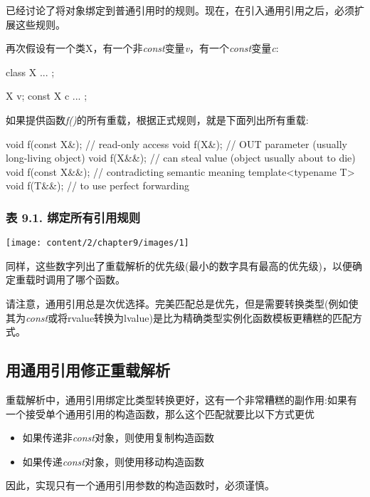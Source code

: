 已经讨论了将对象绑定到普通引用时的规则。现在，在引入通用引用之后，必须扩展这些规则。

再次假设有一个类X，有一个非\textit{const}变量\textit{v}，有一个\textit{const}变量\textit{c}:

\begin{cppcode}
class X {
	...
};

X v;
const X c{ ... };
\end{cppcode}

如果提供函数\textit{f()}的所有重载，根据正式规则，就是下面列出所有重载:

\begin{cppcode}
void f(const X&); // read-only access
void f(X&); // OUT parameter (usually long-living object)
void f(X&&); // can steal value (object usually about to die)
void f(const X&&); // contradicting semantic meaning
template<typename T>
void f(T&&); // to use perfect forwarding
\end{cppcode}

\subsubsection{表 9.1. 绑定所有引用规则}
\begin{center}
	\texttt{[image: content/2/chapter9/images/1]}
\end{center}

同样，这些数字列出了重载解析的优先级(最小的数字具有最高的优先级)，以便确定重载时调用了哪个函数。

请注意，通用引用总是次优选择。完美匹配总是优先，但是需要转换类型(例如使其为\textit{const}或将rvalue转换为lvalue)是比为精确类型实例化函数模板更糟糕的匹配方式。

\subsection{用通用引用修正重载解析}

重载解析中，通用引用绑定比类型转换更好，这有一个非常糟糕的副作用:如果有一个接受单个通用引用的构造函数，那么这个匹配就要比以下方式更优

\begin{itemize}
	\item 如果传递非\textit{const}对象，则使用复制构造函数
	\item 如果传递\textit{const}对象，则使用移动构造函数
\end{itemize}

因此，实现只有一个通用引用参数的构造函数时，必须谨慎。

